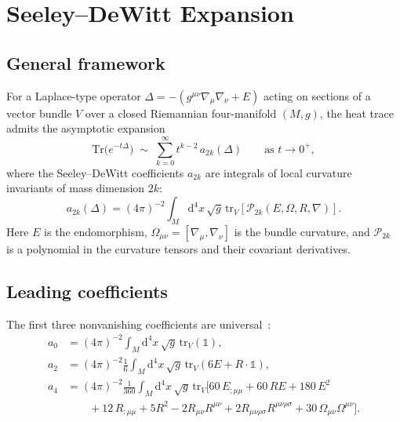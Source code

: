 \documentclass[11pt,a4paper]{article}
\newcommand{\Id}{\mathbb{1}}
\renewcommand{\dd}{\mathrm{d}}
\theoremstyle{plain}
\theoremstyle{definition}
\begin{document}
\section{Seeley--DeWitt Expansion}\label{sec:sdw}

\subsection{General framework}

For a Laplace-type operator $\Delta = -(g^{\mu\nu}\nabla_\mu\nabla_\nu + E)$
acting on sections of a vector bundle $V$ over a closed Riemannian four-manifold
$(M,g)$, the heat trace admits the asymptotic expansion~\cite{V03,G95}
\begin{equation}\label{eq:heat-trace-asymp}
  \mathrm{Tr}\bigl(e^{-t\Delta}\bigr) \;\sim\;
  \sum_{k=0}^{\infty} t^{k-2}\, a_{2k}(\Delta)
  \qquad \text{as } t \to 0^+,
\end{equation}
where the Seeley--DeWitt coefficients $a_{2k}$ are integrals of local curvature
invariants of mass dimension $2k$:
\begin{equation}
  a_{2k}(\Delta) = (4\pi)^{-2} \int_M \dd^4 x\,\sqrt{g}\,
  \mathrm{tr}_V\!\left[\mathcal{P}_{2k}(E,\Omega,R,\nabla)\right].
\end{equation}
Here $E$ is the endomorphism, $\Omega_{\mu\nu} = [\nabla_\mu,\nabla_\nu]$ is
the bundle curvature, and $\mathcal{P}_{2k}$ is a polynomial in the curvature
tensors and their covariant derivatives.

\subsection{Leading coefficients}

The first three nonvanishing coefficients are universal~\cite{V03,G95}:
\begin{align}
  a_0 &= (4\pi)^{-2}\int_M \dd^4 x\,\sqrt{g}\,\mathrm{tr}_V(\Id),
  \label{eq:a0}\\[4pt]
  a_2 &= (4\pi)^{-2}\frac{1}{6}\int_M \dd^4 x\,\sqrt{g}\,
  \mathrm{tr}_V(6E + R\cdot\Id),
  \label{eq:a2}\\[4pt]
  a_4 &= (4\pi)^{-2}\frac{1}{360}\int_M \dd^4 x\,\sqrt{g}\,
  \mathrm{tr}_V\!\bigl[
    60\,E_{;\mu\mu} + 60\,RE + 180\,E^2 \nonumber\\
    &\qquad + 12\,R_{;\mu\mu}
    + 5R^2 - 2R_{\mu\nu}R^{\mu\nu}
    + 2R_{\mu\nu\rho\sigma}R^{\mu\nu\rho\sigma}
    + 30\,\Omega_{\mu\nu}\Omega^{\mu\nu}\bigr].
  \label{eq:a4}
\end{align}
\end{document}
